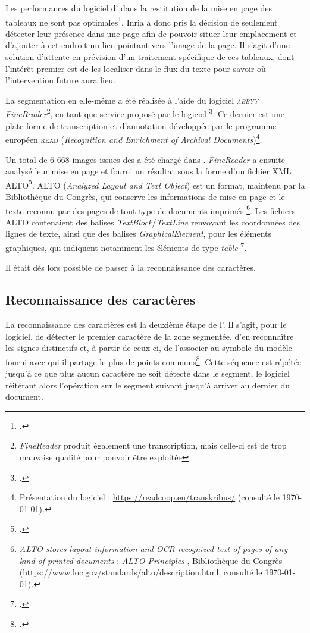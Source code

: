 Les performances du logiciel d'\ocr{} dans la restitution de la mise en page des tableaux ne sont pas optimales\footcite{chague2}. Inria a donc pris la décision de seulement détecter leur présence dans une page afin de pouvoir situer leur emplacement et d'ajouter à cet endroit un lien pointant vers l'image de la page. Il s'agit d'une solution d'attente en prévision d'un traitement spécifique de ces tableaux, dont l'intérêt premier est de les localiser dans le flux du texte pour savoir où l'intervention future aura lieu.

La segmentation en elle-même a été réalisée à l'aide du logiciel \textit{\textsc{abbyy} FineReader}\footnote{\textit{FineReader} produit également une transcription, mais celle-ci est de trop mauvaise qualité pour pouvoir être exploitée}, en tant que service proposé par le logiciel \transkribus{}\footcite{chague2}. Ce dernier est une plate-forme de transcription et d’annotation développée par le programme européen \textsc{read} (\textit{Recognition and Enrichment of Archival Documents})\footnote{Présentation du logiciel : \url{https://readcoop.eu/transkribus/} (consulté le \today).}.

Un total de 6 668 images issues des \odm{} a été chargé dans \transkribus{}. \textit{FineReader} a ensuite analysé leur mise en page et fourni un résultat sous la forme d'un fichier XML ALTO\footcite{alto}. ALTO (\textit{Analyzed Layout and Text Object}) est un format, maintenu par la Bibliothèque du Congrès, qui \og conserve les informations de mise en page et le texte reconnu par \ocr{} des pages de tout type de documents imprimés \fg\footnote{\og \textit{ALTO stores layout information and OCR recognized text of pages of any kind of printed documents} \fg{} : \og \textit{ALTO Principles} \fg, Bibliothèque du Congrès (\url{https://www.loc.gov/standards/alto/description.html}, consulté le \today).}. Les fichiers ALTO contenaient \og des balises \textit{TextBlock}/\textit{TextLine} renvoyant les coordonnées des lignes de texte, ainsi que des balises \textit{GraphicalElement}, pour les éléments graphiques, qui indiquent notamment les éléments de type \textit{table} \fg\footcite{chague2}.

Il était dès lors possible de passer à la reconnaissance des caractères.

\subsection{Reconnaissance des caractères}

La reconnaissance des caractères est la deuxième étape de l'\ocr. Il s'agit, pour le logiciel, de détecter le premier caractère de la zone segmentée, d'en reconnaître les signes distinctifs et, à partir de ceux-ci, de l'associer au symbole du modèle fourni avec qui il partage le plus de points communs\footcite[p.~3]{casey}. Cette séquence est répétée jusqu'à ce que plus aucun caractère ne soit détecté dans le segment, le logiciel réitérant alors l'opération sur le segment suivant jusqu'à arriver au dernier du document.


